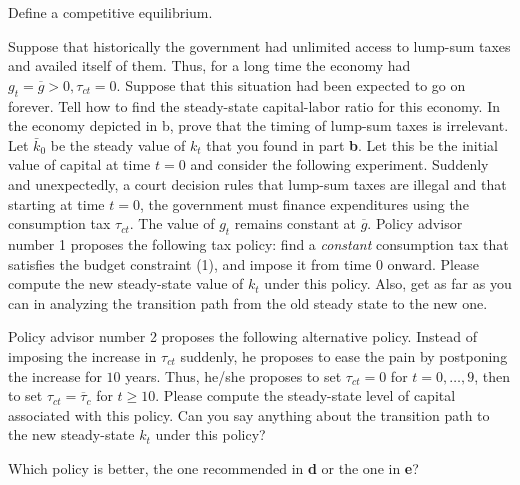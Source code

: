 \medskip


  Define a competitive equilibrium.

\medskip
{}  Suppose that historically the government had
unlimited access to lump-sum taxes and availed itself of them.
Thus, for a long time the economy had  $g_t = \overline g >0,
\tau_{ct} =0$. Suppose that this situation had been expected to go
on forever. Tell how to find the steady-state capital-labor ratio
for this economy.
\medskip
{}  In the economy depicted in b, prove that the
timing of lump-sum taxes is irrelevant.
\medskip
{}  Let $\bar k_0$ be the steady value of $k_t$
that you found in part {\bf b}.   Let this be the initial value of
capital at time $t=0$  and consider the following  experiment.
Suddenly and unexpectedly, a court decision rules that lump-sum
taxes are illegal and that starting at time $t=0$, the government
must finance expenditures using the consumption tax $\tau_{ct}$.
The value of $g_t$ remains constant at $\overline g$. Policy
advisor number 1 proposes the following tax policy: find a {\it
constant\/} consumption tax  that satisfies the budget constraint
(1), and impose it from time $0$ onward. Please compute the new
steady-state  value of $k_t$ under this policy. Also, get as far
as you can in analyzing the transition path from the old steady
state to the new one.

\medskip
{}  Policy advisor number 2 proposes the following
alternative policy.  Instead of imposing the increase in
$\tau_{ct}$ suddenly, he proposes to ease the pain by postponing
the increase for $10$ years. Thus, he/she proposes to set
$\tau_{ct} = 0$ for $t=0, \ldots, 9$, then to set $\tau_{ct}=
\overline \tau_{c}$ for $t\geq 10$. Please compute the steady-state
 level of capital associated with this policy. Can you say
anything about the transition path to the new steady-state $k_t$
under this policy?

\medskip
{}  Which policy is better, the one  recommended
 in {\bf d} or the one in {\bf e}?


